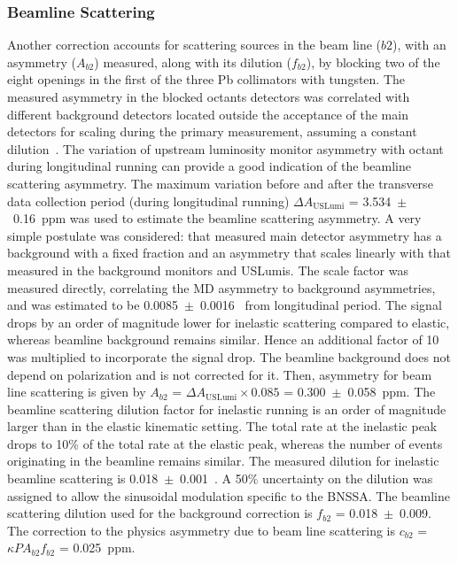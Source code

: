 \subsubsection{Beamline Scattering}
\label{Beamline Scattering}
Another correction accounts for scattering sources in the beam line ($b2$), with an asymmetry ($A_{b2}$) measured, along with its dilution ($f_{b2}$), by blocking two of the eight openings in the first of the three Pb collimators with tungsten. The measured asymmetry in the blocked octants detectors was correlated with different background detectors located outside the acceptance of the main detectors for scaling during the primary measurement, assuming a constant dilution~\cite{elog:kent_analysis782}. The variation of upstream luminosity monitor asymmetry with octant during longitudinal running can provide a good indication of the beamline scattering asymmetry. The maximum variation before and after the transverse data collection period (during longitudinal running) $\Delta A_\textrm{USLumi}$ = 3.534~$\pm$~0.16~ppm was used to estimate the beamline scattering asymmetry. A very simple postulate was considered: that measured main detector asymmetry has a background with a fixed fraction and an asymmetry that scales linearly with that measured in the background monitors and USLumis. The scale factor was measured directly, correlating the MD asymmetry to background asymmetries, and was estimated to be 0.0085~$\pm$~0.0016~\cite{elog:manolis_analysis1191} from longitudinal period. The signal drops by an order of magnitude lower for inelastic scattering compared to elastic, whereas beamline background remains similar. Hence an additional factor of 10 was multiplied to incorporate the signal drop. The beamline background does not depend on polarization and is not corrected for it. Then, asymmetry for beam line scattering is given by $A_{b2}$ = $\Delta A_\textrm{USLumi}\times 0.085$ = 0.300~$\pm$~0.058~ppm. 
The beamline scattering dilution factor for inelastic running is an order of magnitude larger than in the elastic kinematic setting. The total rate at the inelastic peak drops to 10\% of the total rate at the elastic peak, whereas the number of events originating in the beamline remains similar. The measured dilution for inelastic beamline scattering is 0.018~$\pm$~0.001~\cite{leacock_qweak, elog:mack_analysis784}. A 50\% uncertainty on the dilution was assigned to allow the sinusoidal modulation specific to the BNSSA. The beamline scattering dilution used for the background correction is $f_{b2}$ = 0.018~$\pm$~0.009. 
The correction to the physics asymmetry due to beam line scattering is $c_{b2}$ = $\kappa PA_{b2}f_{b2}$ = 0.025~ppm.

